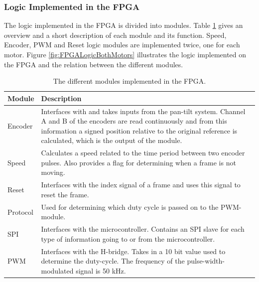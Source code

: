 \documentclass[../../main.tex]{subfiles}
\begin{document}
\subsubsection*{Logic Implemented in the FPGA}

The logic implemented in the FPGA is divided into modules. Table \ref{tab:FPGAModulesDescription}
gives an overview and a short description of each module and its function. Speed, Encoder, PWM and Reset logic modules are implemented twice, one for each motor. Figure \ref{fig:FPGALogicBothMotors} illustrates the logic implemented on the FPGA and the relation between the different modules.     
\begin{table}[]
    \centering
    
    \begin{tabular}{l|p{}} %
        Module & Description \\
        \hline
        Encoder & Interfaces with and takes inputs from the pan-tilt system. Channel A and B of the encoders are read continuously and from this information a signed position relative to the original reference is calculated, which is the output of the module. \\
        \hline
        Speed & Calculates a speed related to the time period between two encoder pulses. Also provides a flag for determining when a frame is not moving.\\
        \hline
        Reset & Interfaces with the index signal of a frame and uses this signal to reset the frame. \\
        \hline
        Protocol & Used for determining which duty cycle is passed on to the PWM-module.\\
        \hline
        SPI & Interfaces with the microcontroller. Contains an SPI slave for each type of information going to or from the microcontroller. \\
        \hline
        PWM & Interfaces with the H-bridge. Takes in a 10 bit value used to determine the duty-cycle. The frequency of the pulse-width-modulated signal is 50 kHz.
    \end{tabular}    
    
    \caption{The different modules implemented in the FPGA.}
    \label{tab:FPGAModulesDescription}
\end{table}
\end{document}
